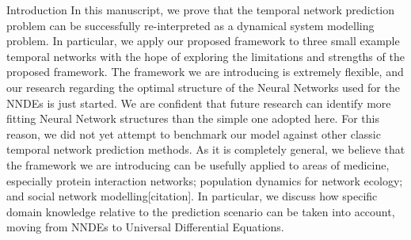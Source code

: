 \documentclass{article}
\begin{document}
\begin{section}{Introduction}
In this manuscript, we prove that the temporal network prediction problem can be successfully re-interpreted as a dynamical system modelling problem. In particular, we apply our proposed framework to three small example temporal networks with the hope of exploring the limitations and strengths of the proposed framework.
The framework we are introducing is extremely flexible, and our research regarding the optimal structure of the Neural Networks used for the NNDEs is just started.
We are confident that future research can identify more fitting Neural Network structures than the simple one adopted here.
For this reason, we did not yet attempt to benchmark our model against other classic temporal network prediction methods.
As it is completely general, we believe that the framework we are introducing can be usefully applied to areas of medicine, especially protein interaction networks; population dynamics for network ecology; and social network modelling[citation]. In particular, we discuss how specific domain knowledge relative to the prediction scenario can be taken into account, moving from NNDEs to Universal Differential Equations.

\end{section}
\end{document}
